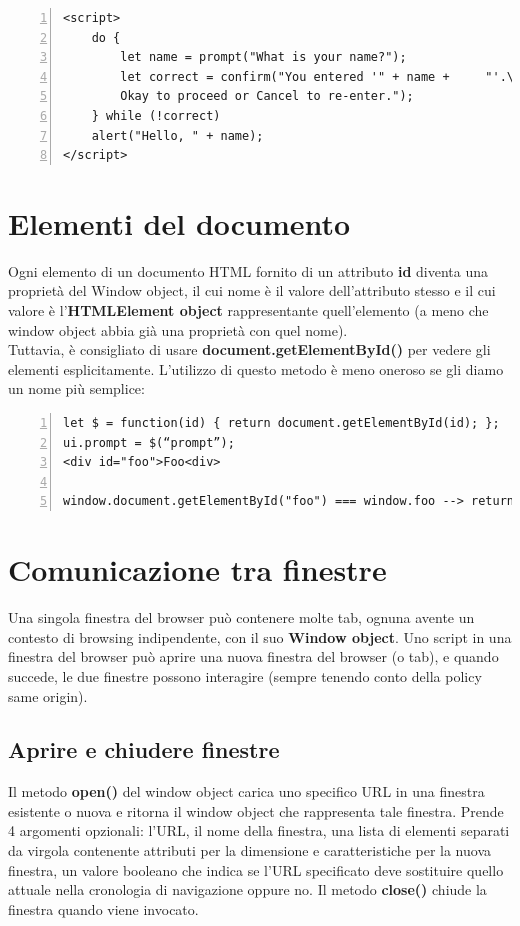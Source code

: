 \begin{Verbatim}[numbers = left, frame = single]
<script>
    do {
        let name = prompt("What is your name?");
        let correct = confirm("You entered '" + name +     "'.\n" + "Click 
        Okay to proceed or Cancel to re-enter.");
    } while (!correct)
    alert("Hello, " + name);
</script>
\end{Verbatim}

\section{Elementi del documento}
Ogni elemento di un documento HTML fornito di un attributo \textbf{id} diventa una proprietà del Window object, il cui nome è il valore dell'attributo stesso e il cui valore è l'\textbf{HTMLElement object} rappresentante quell'elemento (a meno che window object abbia già una proprietà con quel nome). \\

Tuttavia, è consigliato di usare \textbf{document.getElementById()} per vedere gli elementi esplicitamente. L'utilizzo di questo metodo è meno oneroso se gli diamo un nome più semplice:

\begin{Verbatim}[numbers = left, frame = single]
let $ = function(id) { return document.getElementById(id); };
ui.prompt = $(“prompt”);
<div id="foo">Foo<div>

window.document.getElementById("foo") === window.foo --> returns true
\end{Verbatim}

\section{Comunicazione tra finestre}
Una singola finestra del browser può contenere molte tab, ognuna avente un contesto di browsing indipendente, con il suo \textbf{Window object}.
Uno script in una finestra del browser può aprire una nuova finestra del browser (o tab), e quando succede, le due finestre possono interagire (sempre tenendo conto della policy same origin).

\subsection{Aprire e chiudere finestre}
Il metodo \textbf{open()} del window object carica uno specifico URL in una finestra esistente o nuova e ritorna il window object che rappresenta tale finestra. Prende 4 argomenti opzionali: l'URL, il nome della finestra, una lista di elementi separati da virgola contenente attributi per la dimensione e caratteristiche per la nuova finestra, un valore booleano che indica se l'URL specificato deve sostituire quello attuale nella cronologia di navigazione oppure no. 
Il metodo \textbf{close()} chiude la finestra quando viene invocato.

